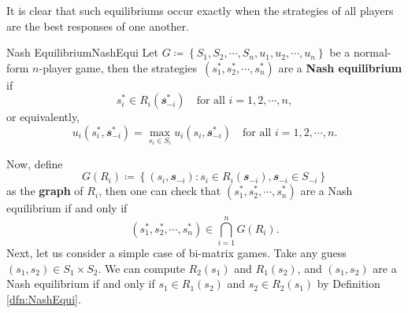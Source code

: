 \documentclass[math]{amznotes}
\theoremstyle{remark}
\begin{document}
It is clear that such equilibriums occur exactly when the strategies of all players are the best responses of one another.
\begin{dfnbox}{Nash Equilibrium}{NashEqui}
    Let $G \coloneqq \left\{S_1, S_2, \cdots, S_n, u_1, u_2, \cdots, u_n\right\}$ be a normal-form $n$-player game, then the strategies~$\left(s_1^*, s_2^*, \cdots, s_n^*\right)$ are a {\color{red} \textbf{Nash equilibrium}} if 
    \begin{equation*}
        s_i^* \in R_i\left(\mathbfit{s}_{-i}^*\right) \quad\textrm{for all } i = 1, 2, \cdots, n, 
    \end{equation*}
    or equivalently, 
    \begin{equation*}
        u_i\left(s_i^*, \mathbfit{s}_{-i}^*\right) = \max_{s_i \in S_i}u_i\left(s_i, \mathbfit{s}_{-i}^*\right) \quad\textrm{for all } i = 1, 2, \cdots, n.
    \end{equation*}
\end{dfnbox}
Now, define 
\begin{equation*}
    G\left(R_i\right) \coloneqq \left\{\left(s_i, \mathbfit{s}_{-i}\right) \colon s_i \in R_i\left(\mathbfit{s}_{-i}\right), \mathbfit{s}_{-i} \in S_{-i}\right\}
\end{equation*}
as the \textbf{graph} of $R_i$, then one can check that $\left(s_1^*, s_2^*, \cdots, s_n^*\right)$ are a Nash equilibrium if and only if 
\begin{equation*}
    \left(s_1^*, s_2^*, \cdots, s_n^*\right) \in \bigcap_{i = 1}^n G\left(R_i\right).
\end{equation*}
Next, let us consider a simple case of bi-matrix games. Take any guess $\left(s_1, s_2\right) \in S_1 \times S_2$. We can compute $R_2\left(s_1\right)$ and $R_1\left(s_2\right)$, and $\left(s_1, s_2\right)$ are a Nash equilibrium if and only if $s_1 \in R_1\left(s_2\right)$ and $s_2 \in R_2\left(s_1\right)$ by Definition \ref{dfn:NashEqui}.
\end{document}
